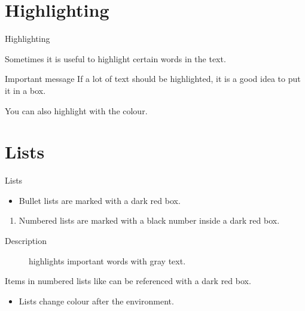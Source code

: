 \documentclass[USenglish, aspectratio = 169]{beamer}
\begin{document}
\section{Highlighting}

\begin{frame}{Highlighting}

    Sometimes it is useful to \alert{highlight} certain words in the text.

    \begin{alertblock}{Important message}
        If a lot of text should be \alert{highlighted}, it is a good idea to put it in a box.
    \end{alertblock}

    You can also highlight with the  colour.
\end{frame}

\section{Lists}

\begin{frame}{Lists}

    \begin{itemize}
        \item
        Bullet lists are marked with a dark red box.
    \end{itemize}

    \begin{enumerate}
        \item
        \label{enum:item}
        Numbered lists are marked with a black number inside a dark red box.
    \end{enumerate}

    \begin{description}
        \item[Description] highlights important words with gray text.
    \end{description}

    Items in numbered lists like  can be referenced with a dark red box.

    \begin{example}
        \begin{itemize}
            \item
            Lists change colour after the environment.
        \end{itemize}
    \end{example}
\end{frame}
\end{document}
